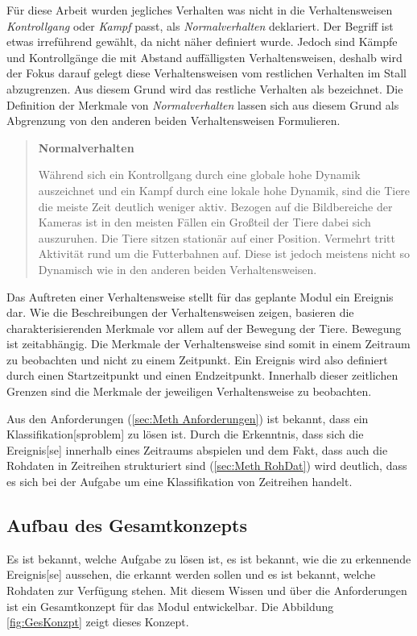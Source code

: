 Für diese Arbeit wurden jegliches Verhalten was nicht in die Verhaltensweisen \textit{Kontrollgang} oder \textit{Kampf} passt, als \textit{Normalverhalten} deklariert. Der Begriff ist etwas irreführend gewählt, da  nicht näher definiert wurde. Jedoch sind Kämpfe und Kontrollgänge die mit Abstand auffälligsten Verhaltensweisen, deshalb wird der Fokus darauf gelegt diese Verhaltensweisen vom restlichen Verhalten im Stall abzugrenzen. Aus diesem Grund wird das restliche Verhalten als  bezeichnet. Die Definition der Merkmale von \textit{Normalverhalten} lassen sich aus diesem Grund als Abgrenzung von den anderen beiden Verhaltensweisen Formulieren.\dubpar

\begin{quote}
\textbf{Normalverhalten}\par
Während sich ein Kontrollgang durch eine globale hohe Dynamik auszeichnet und ein Kampf durch eine lokale hohe Dynamik, sind die Tiere die meiste Zeit deutlich weniger aktiv. Bezogen auf die Bildbereiche der Kameras ist in den meisten Fällen ein Großteil der Tiere dabei sich auszuruhen. Die Tiere sitzen stationär auf einer Position. Vermehrt tritt Aktivität rund um die Futterbahnen auf. Diese ist jedoch meistens nicht so Dynamisch wie in den anderen beiden Verhaltensweisen.
\end{quote}
\par

Das Auftreten einer Verhaltensweise stellt für das geplante \gls{Modul} ein \gls{Ereignis} dar. Wie die Beschreibungen der Verhaltensweisen zeigen, basieren die charakterisierenden Merkmale vor allem auf der Bewegung der Tiere. Bewegung ist zeitabhängig. Die Merkmale der Verhaltensweise sind somit in einem Zeitraum zu beobachten und nicht zu einem Zeitpunkt. Ein \gls{Ereignis} wird also definiert durch einen Startzeitpunkt und einen Endzeitpunkt. Innerhalb dieser zeitlichen Grenzen sind die Merkmale der jeweiligen Verhaltensweise zu beobachten. \par

Aus den Anforderungen (\ref{sec:Meth Anforderungen}) ist bekannt, dass ein \gls{Klassifikation}[sproblem] zu lösen ist. Durch die Erkenntnis, dass sich die \gls{Ereignis}[se] innerhalb eines Zeitraums abspielen und dem Fakt, dass auch die Rohdaten in Zeitreihen strukturiert sind (\ref{sec:Meth RohDat}) wird deutlich, dass es sich bei der Aufgabe um eine \gls{Klassifikation} von Zeitreihen handelt.\par

\subsection{Aufbau des Gesamtkonzepts}
Es ist bekannt, welche Aufgabe zu lösen ist, es ist bekannt, wie die zu erkennende \gls{Ereignis}[se] aussehen, die erkannt werden sollen und es ist bekannt, welche Rohdaten zur Verfügung stehen. Mit diesem Wissen und über die Anforderungen ist ein Gesamtkonzept für das \gls{Modul} entwickelbar. Die Abbildung \ref{fig:GesKonzpt} zeigt dieses Konzept.

